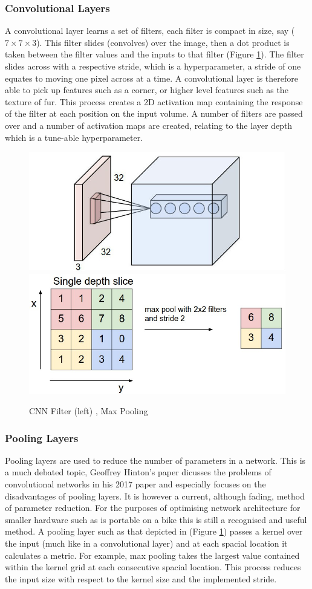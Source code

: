 \documentclass[11pt,twoside]{report}
\begin{document}
\subsubsection{Convolutional Layers}
A convolutional layer learns a set of filters, each filter is compact in size, say ($7 \times 7 \times 3$). This filter slides (convolves) over the image, then a dot product is taken between the filter values and the inputs to that filter (Figure \ref{CNN_filter}). The filter slides across with a respective stride, which is a hyperparameter, a stride of one equates to moving one pixel across at a time. A convolutional layer is therefore able to pick up features such as a corner, or higher level features such as the texture of fur. This process creates a 2D activation map containing the response of the filter at each position on the input volume. A number of filters are passed over and a number of activation maps are created, relating to the layer depth which is a tune-able hyperparameter.

\noindent \begin{figure}[h!]
	\includegraphics[width = 0.5\hsize]{./figures/conv_filter.jpg}
	\includegraphics[width = 0.5\hsize]{./figures/maxpool.jpeg}
	\caption{CNN Filter (left) \cite{StanfordCS231_conv_filter}, Max Pooling \cite{StanfordCS231_max_pool}}
	\label{CNN_filter}
\end{figure}

\subsubsection{Pooling Layers}
Pooling layers are used to reduce the number of parameters in a network. This is a much debated topic, Geoffrey Hinton's paper \cite{DBLP:journals/corr/abs-1710-09829} dicusses the problems of convolutional networks in his 2017 paper and especially focuses on the disadvantages of pooling layers. It is however a current, although fading, method of parameter reduction. For the purposes of optimising network architecture for smaller hardware such as is portable on a bike this is still a recognised and useful method.
\newline \newline
A pooling layer such as that depicted in (Figure \ref{CNN_filter}) passes a kernel over the input (much like in a convolutional layer) and at each spacial location it calculates a metric. For example, max pooling takes the largest value contained within the kernel grid at each consecutive spacial location. This process reduces the input size with respect to the kernel size and the implemented stride.
\end{document}
